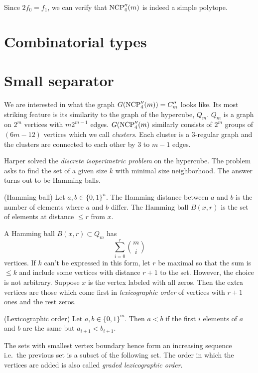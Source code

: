 Since $2f_0 = f_1$, we can verify that $\textrm{NCP}''_4(m)$ is indeed a simple 
polytope.

\section{Combinatorial types}

\section{Small separator}

We are interested in what the graph $G(\textrm{NCP}''_4(m)) = C''_m$ looks like. Its 
most striking feature is its similarity to the graph of the hypercube, $Q_m$. 
$Q_m$ is a graph on $2^m$ vertices with $m2^{m-1}$ edges. $G(\textrm{NCP}''_4(m)$ 
similarly consists of $2^m$ groups of $(6m-12)$ vertices which we call 
\textit{clusters}. Each cluster is a 3-regular graph and the clusters are 
connected to each other by 3 to $m-1$ edges. 

Harper solved the \textit{discrete isoperimetric problem} on the hypercube. The 
problem asks to find the set of a given size $k$ with minimal size 
neighborhood. The answer turns out to be Hamming balls.

\begin{definition}
 (Hamming ball) Let $a,b \in \{0,1\}^n$. The Hamming distance between $a$ and 
$b$ is the number of elements where $a$ and $b$ differ. The Hamming ball 
$B(x,r)$ is the set of elements at distance $\leq r$ from $x$.
\end{definition}

A Hamming ball $B(x,r) \subset Q_m$ has 
\begin{equation}
 \sum_{i=0}^r {m \choose i}
\end{equation}
vertices. If $k$ can't be expressed in this form, let $r$ be maximal so that 
the sum is $\leq k$ and include some vertices with distance $r+1$ to the set. 
However, the choice is not arbitrary. Suppose $x$ is the vertex labeled with 
all zeros. Then the extra vertices are those which come first in 
\textit{lexicographic order} of vertices with $r+1$ ones and the rest zeros.
\begin{definition}
 (Lexicographic order) Let $a,b \in \{0,1\}^m$. Then $a<b$ if the first $i$ 
elements of $a$ and $b$ are the same but $a_{i+1} < b_{i+1}$.
\end{definition}
The sets with smallest vertex boundary hence form an increasing sequence i.e.\ 
the previous set is a subset of the following set. The order in which the 
vertices are added is also called \textit{graded lexicographic order}.

